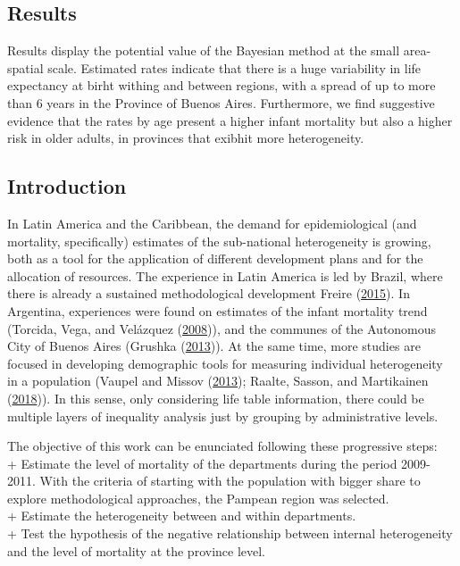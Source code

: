 \documentclass[12pt,]{article}
\begin{document}
\hypertarget{results}{%
\subsection{\texorpdfstring{\textbf{Results}}{Results}}\label{results}}

Results display the potential value of the Bayesian method at the small
area-spatial scale. Estimated rates indicate that there is a huge
variability in life expectancy at birht withing and between regions,
with a spread of up to more than 6 years in the Province of Buenos
Aires. Furthermore, we find suggestive evidence that the rates by age
present a higher infant mortality but also a higher risk in older
adults, in provinces that exibhit more heterogeneity.

\hypertarget{introduction}{%
\subsection{\texorpdfstring{\textbf{Introduction}}{Introduction}}\label{introduction}}

In Latin America and the Caribbean, the demand for epidemiological (and
mortality, specifically) estimates of the sub-national heterogeneity is
growing, both as a tool for the application of different development
plans and for the allocation of resources. The experience in Latin
America is led by Brazil, where there is already a sustained
methodological development Freire
(\protect\hyperlink{ref-FreireEtAl2015}{2015}). In Argentina,
experiences were found on estimates of the infant mortality trend
(Torcida, Vega, and Velázquez
(\protect\hyperlink{ref-torcida2008}{2008})), and the communes of the
Autonomous City of Buenos Aires (Grushka
(\protect\hyperlink{ref-Grushka2013}{2013})). At the same time, more
studies are focused in developing demographic tools for measuring
individual heterogeneity in a population (Vaupel and Missov
(\protect\hyperlink{ref-Vaupel_Missov_2013}{2013}); Raalte, Sasson, and
Martikainen
(\protect\hyperlink{ref-vanRaalte_Sasson_Martikainen_2018}{2018})). In
this sense, only considering life table information, there could be
multiple layers of inequality analysis just by grouping by
administrative levels.

The objective of this work can be enunciated following these progressive
steps:\\
+ Estimate the level of mortality of the departments during the period
2009-2011. With the criteria of starting with the population with bigger
share to explore methodological approaches, the Pampean region was
selected.\\
+ Estimate the heterogeneity between and within departments.\\
+ Test the hypothesis of the negative relationship between internal
heterogeneity and the level of mortality at the province level.
\end{document}
